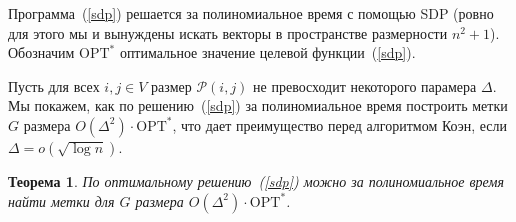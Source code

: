 \documentclass[12pt]{article}
\newcommand{\Pc}{\mathcal{P}}
\newtheorem{theorem}{Теорема}
\begin{document}
    Программа~(\ref{sdp}) решается за полиномиальное время с помощью SDP (ровно для этого мы и вынуждены искать
    векторы в пространстве размерности $n^2 + 1$).
    Обозначим $\mathrm{OPT}^*$ оптимальное значение целевой функции~(\ref{sdp}).

    Пусть для всех $i, j \in V$ размер $\Pc(i, j)$ не превосходит некоторого парамера $\Delta$.
    Мы покажем, как по решению~(\ref{sdp}) за полиномиальное время построить метки $G$ размера
    $O(\Delta^2) \cdot \mathrm{OPT}^*$, что дает преимущество перед алгоритмом Коэн, если $\Delta = o(\sqrt{\log n})$.

    \begin{theorem}
        По оптимальному решению~(\ref{sdp}) можно за полиномиальное время найти метки для $G$
        размера $O(\Delta^2) \cdot \mathrm{OPT}^*$.
    \end{theorem}
\end{document}
